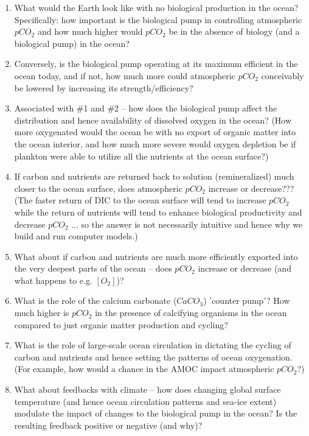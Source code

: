 \begin{enumerate}[noitemsep]
\vspace{1mm}
\item What would the Earth look like with no biological production in the ocean? Specifically: how important is the biological pump in controlling atmospheric \(pCO_{2}\) and how much higher would \(pCO_{2}\) be in the absence of biology (and a biological pump) in the ocean?
\vspace{1mm}
\item Conversely, is the biological pump operating at its maximum efficient in the ocean today, and if not, how much more could atmospheric \(pCO_{2}\) conceivably be lowered by increasing its strength/efficiency?
\vspace{1mm}
\item Associated with \#1 and \#2 -- how does the biological pump affect the distribution and hence availability of dissolved oxygen in the ocean? (How more oxygenated would the ocean be with no export of organic matter into the ocean interior, and how much more severe would oxygen depletion be if plankton were able to utilize all the nutrients at the ocean surface?)
\vspace{1mm}
\item If carbon and nutrients are returned back to solution (remineralized) much closer to the ocean surface, does atmospheric \(pCO_{2}\) increase or decrease??? (The faster return of DIC to the ocean surface will tend to increase \(pCO_{2}\) while the return of nutrients will tend to enhance biological productivity and decrease \(pCO_{2}\) ... so the answer is not necessarily intuitive and hence why we build and run computer models.)
\vspace{1mm}
\item What about if carbon and nutrients are much more efficiently exported into the very deepest parts of the ocean -- does \(pCO_{2}\) increase or decrease (and what happens to e.g. \([O_{2}]\))?
\vspace{1mm}
\item What is the role of the calcium carbonate (\(CaCO_{3}\)) 'counter pump'? How much higher is \(pCO_{2}\) in the presence of calcifying organisms in the ocean compared to just organic matter production and cycling?
\vspace{1mm}
\item What is the role of large-scale ocean circulation in dictating the cycling of carbon and nutrients and hence setting the patterns of ocean oxygenation. (For example, how would a chance in the AMOC impact atmospheric \(pCO_{2}\)?)
\vspace{1mm}
\item What about feedbacks with climate -- how does changing global surface temperature (and hence ocean circulation patterns and sea-ice extent) modulate the impact of changes to the biological pump in the ocean? Is the resulting feedback positive or negative (and why)?
\end{enumerate}
\vspace{1mm}

